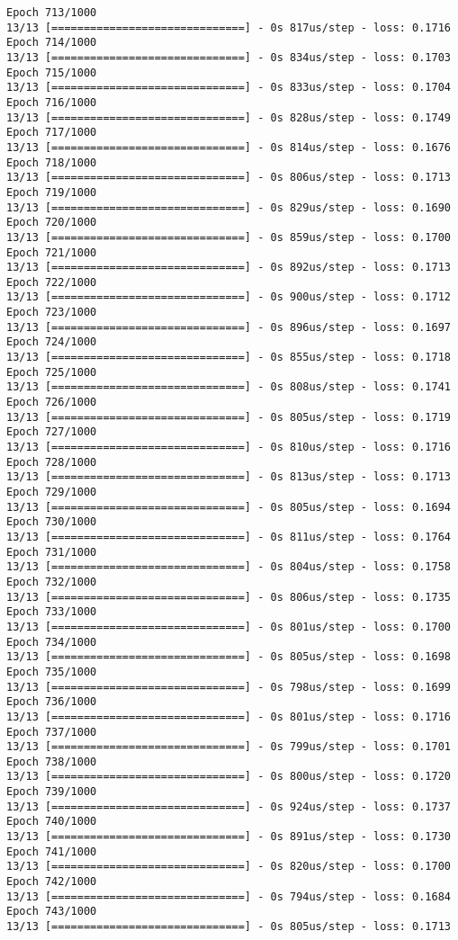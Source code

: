 \documentclass[11pt]{article}
\begin{document}
\begin{Verbatim}[commandchars=\\\{\}]
Epoch 713/1000
13/13 [==============================] - 0s 817us/step - loss: 0.1716
Epoch 714/1000
13/13 [==============================] - 0s 834us/step - loss: 0.1703
Epoch 715/1000
13/13 [==============================] - 0s 833us/step - loss: 0.1704
Epoch 716/1000
13/13 [==============================] - 0s 828us/step - loss: 0.1749
Epoch 717/1000
13/13 [==============================] - 0s 814us/step - loss: 0.1676
Epoch 718/1000
13/13 [==============================] - 0s 806us/step - loss: 0.1713
Epoch 719/1000
13/13 [==============================] - 0s 829us/step - loss: 0.1690
Epoch 720/1000
13/13 [==============================] - 0s 859us/step - loss: 0.1700
Epoch 721/1000
13/13 [==============================] - 0s 892us/step - loss: 0.1713
Epoch 722/1000
13/13 [==============================] - 0s 900us/step - loss: 0.1712
Epoch 723/1000
13/13 [==============================] - 0s 896us/step - loss: 0.1697
Epoch 724/1000
13/13 [==============================] - 0s 855us/step - loss: 0.1718
Epoch 725/1000
13/13 [==============================] - 0s 808us/step - loss: 0.1741
Epoch 726/1000
13/13 [==============================] - 0s 805us/step - loss: 0.1719
Epoch 727/1000
13/13 [==============================] - 0s 810us/step - loss: 0.1716
Epoch 728/1000
13/13 [==============================] - 0s 813us/step - loss: 0.1713
Epoch 729/1000
13/13 [==============================] - 0s 805us/step - loss: 0.1694
Epoch 730/1000
13/13 [==============================] - 0s 811us/step - loss: 0.1764
Epoch 731/1000
13/13 [==============================] - 0s 804us/step - loss: 0.1758
Epoch 732/1000
13/13 [==============================] - 0s 806us/step - loss: 0.1735
Epoch 733/1000
13/13 [==============================] - 0s 801us/step - loss: 0.1700
Epoch 734/1000
13/13 [==============================] - 0s 805us/step - loss: 0.1698
Epoch 735/1000
13/13 [==============================] - 0s 798us/step - loss: 0.1699
Epoch 736/1000
13/13 [==============================] - 0s 801us/step - loss: 0.1716
Epoch 737/1000
13/13 [==============================] - 0s 799us/step - loss: 0.1701
Epoch 738/1000
13/13 [==============================] - 0s 800us/step - loss: 0.1720
Epoch 739/1000
13/13 [==============================] - 0s 924us/step - loss: 0.1737
Epoch 740/1000
13/13 [==============================] - 0s 891us/step - loss: 0.1730
Epoch 741/1000
13/13 [==============================] - 0s 820us/step - loss: 0.1700
Epoch 742/1000
13/13 [==============================] - 0s 794us/step - loss: 0.1684
Epoch 743/1000
13/13 [==============================] - 0s 805us/step - loss: 0.1713

\end{Verbatim}
\end{document}
